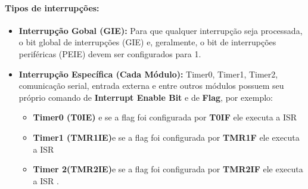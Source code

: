 \documentclass[12pt,a4paper]{book}
\begin{document}
\paragraph{Tipos de interrupções:}
\begin{itemize}
    \item \textbf{Interrupção Gobal (GIE):} Para que qualquer interrupção seja processada, o bit global de interrupções (GIE) e, geralmente, o bit de interrupções periféricas (PEIE) devem ser configurados para 1.
    \item \textbf{Interrupção Específica (Cada Módulo):} Timer0, Timer1, Timer2, comunicação serial, entrada externa e entre outros módulos possuem seu próprio  comando de \textbf{Interrupt Enable Bit} e de \textbf{Flag}, por exemplo: 
    \begin{itemize}
        \item \textbf{Timer0 (T0IE)} e se a flag foi configurada por \textbf{T0IF} ele executa a ISR
        \item \textbf{Timer1 (TMR1IE)}e se a flag foi configurada por \textbf{TMR1F} ele executa a ISR
        \item \textbf{Timer 2(TMR2IE)}e se a flag foi configurada por \textbf{TMR2IF} ele executa a ISR  .
    \end{itemize}
\end{itemize}
\end{document}
